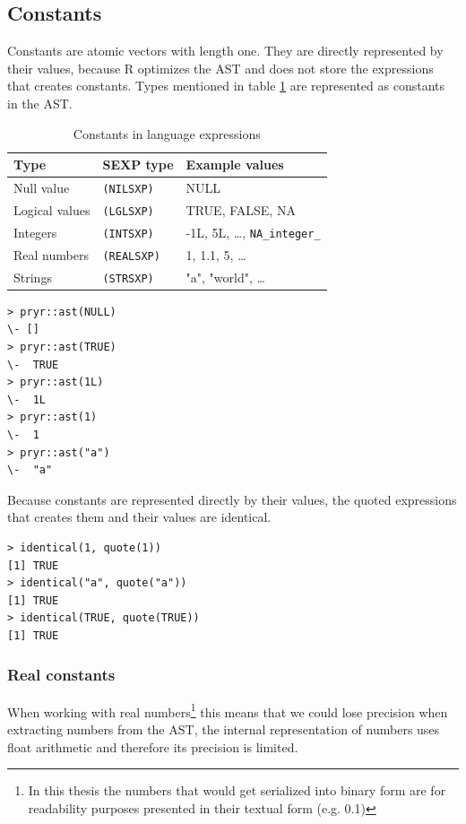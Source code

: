 \documentclass[thesis=B,english]{FITthesis}[2012/10/20]
\begin{document}
\subsection{Constants}
Constants are atomic vectors with length one. They are directly represented by their values, because R optimizes the AST and does not store the expressions that creates constants. Types mentioned in table \ref{tab:astConstants} are represented as constants in the AST.

\begin{table}[h]\centering
	\caption[Constants in language expressions]{Constants in language expressions}\label{tab:astConstants}
	\begin{tabular}{|l|l|l|} \hline
        Type & SEXP type & Example values \tabularnewline \hline \hline
        Null value & \verb|(NILSXP)| & NULL \tabularnewline \hline
        Logical values & \verb|(LGLSXP)| & TRUE, FALSE, NA\tabularnewline \hline
        Integers & \verb|(INTSXP)| & -1L, 5L, \ldots, \verb|NA_integer_|\tabularnewline \hline
        Real numbers & \verb|(REALSXP)| & 1, 1.1, 5, \ldots\tabularnewline \hline
        Strings & \verb|(STRSXP)| & "a", "world", \ldots\tabularnewline \hline
    \end{tabular}
\end{table}

\begin{verbatim}
> pryr::ast(NULL)
\- []
> pryr::ast(TRUE)
\-  TRUE
> pryr::ast(1L)
\-  1L
> pryr::ast(1)
\-  1
> pryr::ast("a")
\-  "a"
\end{verbatim}

Because constants are represented directly by their values, the quoted expressions that creates them and their values are identical.

\begin{verbatim}
> identical(1, quote(1))
[1] TRUE
> identical("a", quote("a"))
[1] TRUE
> identical(TRUE, quote(TRUE))
[1] TRUE
\end{verbatim}

\subsubsection{Real constants}
When working with real numbers\footnote{In this thesis the numbers that would get serialized into binary form are for readability purposes presented in their textual form (e.g. 0.1)} this means that we could lose precision when extracting numbers from the AST, the internal representation of numbers uses float arithmetic and therefore its precision is limited.
\end{document}

